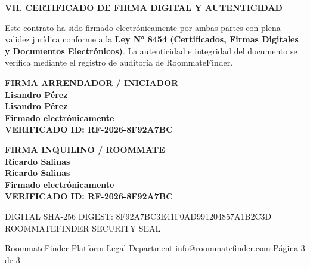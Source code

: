 \documentclass[11pt,letterpaper]{article}
\newcommand{\IDContrato}{RF-2026-8F92A7BC}
\newcommand{\NombreArrendador}{Lisandro Pérez}
\newcommand{\NombreInquilino}{Ricardo Salinas}
\newcommand{\LeyFirmaDigital}{Ley N° 8454 (Certificados, Firmas Digitales y Documentos Electrónicos)}
\begin{document}
\vspace{0.5em}

{\large\bfseries\color{darkslate} VII. CERTIFICADO DE FIRMA DIGITAL Y AUTENTICIDAD}

\small\color{bodytext}
Este contrato ha sido firmado electrónicamente por ambas partes con plena validez jurídica conforme a la \textbf{\LeyFirmaDigital{}}. La autenticidad e integridad del documento se verifica mediante el registro de auditoría de RoommateFinder.

\vspace{1.5em}

\begin{minipage}[t]{0.46\textwidth}
    \begin{tcolorbox}[colback=white, colframe=slateborder, boxrule=0.8pt, arc=4pt, left=6pt, right=6pt, top=6pt, bottom=6pt]
        \small\bfseries\color{gray} FIRMA ARRENDADOR / INICIADOR\\[4pt]
        {\large{}\selectfont \NombreArrendador{}}\\[4pt]
        \small\textbf{\NombreArrendador{}}\\[1pt]
        \scriptsize\color{gray} Firmado electrónicamente\\
        \scriptsize\color{emeraldgreen}\textbf{VERIFICADO \textbullet{} ID: \IDContrato}
    \end{tcolorbox}
\end{minipage}
\hfill
\begin{minipage}[t]{0.46\textwidth}
    \begin{tcolorbox}[colback=white, colframe=slateborder, boxrule=0.8pt, arc=4pt, left=6pt, right=6pt, top=6pt, bottom=6pt]
        \small\bfseries\color{gray} FIRMA INQUILINO / ROOMMATE\\[4pt]
        {\large{}\selectfont \NombreInquilino{}}\\[4pt]
        \small\textbf{\NombreInquilino{}}\\[1pt]
        \scriptsize\color{gray} Firmado electrónicamente\\
        \scriptsize\color{emeraldgreen}\textbf{VERIFICADO \textbullet{} ID: \IDContrato}
    \end{tcolorbox}
\end{minipage}

\vspace{1.5em}

\begin{tcolorbox}[colback=lightbg, colframe=slateborder, boxrule=0.5pt, arc=3pt, left=4pt, right=4pt, top=4pt, bottom=4pt]
    \centering\scriptsize\ttfamily\color{gray}
    DIGITAL SHA-256 DIGEST: 8F92A7BC3E41F0AD991204857A1B2C3D \textbullet{} ROOMMATEFINDER SECURITY SEAL
\end{tcolorbox}

\vfill
\begin{center}
    \small\color{gray} RoommateFinder Platform Legal Department \textbullet{} info@roommatefinder.com \hfill Página 3 de 3
\end{center}
\end{document}
